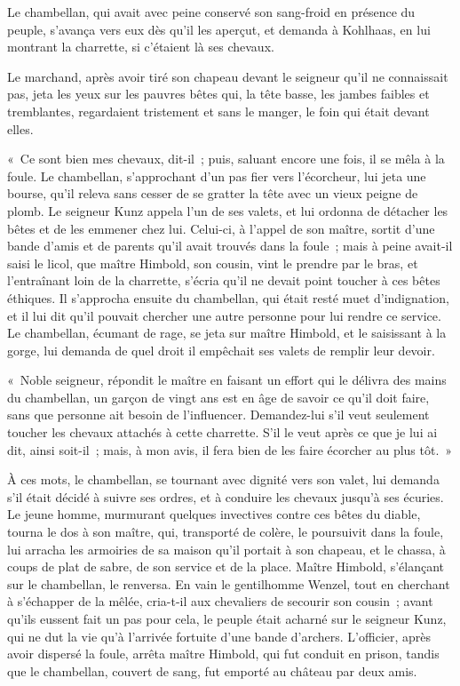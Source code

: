 \documentclass[french,twoside]{book} %
\begin{document}
Le chambellan, qui avait avec peine conservé son sang-froid en présence du peuple, s’avança vers eux dès qu’il les aperçut, et demanda à Kohlhaas, en lui montrant la charrette, si c’étaient là ses chevaux.\par
Le marchand, après avoir tiré son chapeau devant le seigneur qu’il ne connaissait pas, jeta les yeux sur les pauvres bêtes qui, la tête basse, les jambes faibles et tremblantes, regardaient tristement et sans le manger, le foin qui était devant elles.\par
« Ce sont bien mes chevaux, dit-il ; puis, saluant encore une fois, il se mêla à la foule. Le chambellan, s’approchant d’un pas fier vers l’écorcheur, lui jeta une bourse, qu’il releva sans cesser de se gratter la tête avec un vieux peigne de plomb. Le seigneur Kunz appela l’un de ses valets, et lui ordonna de détacher les bêtes et de les emmener chez lui. Celui-ci, à l’appel de son maître, sortit d’une bande d’amis et de parents qu’il avait trouvés dans la foule ; mais à peine avait-il saisi le licol, que maître Himbold, son cousin, vint le prendre par le bras, et l’entraînant loin de la charrette, s’écria qu’il ne devait point toucher à ces bêtes éthiques. Il s’approcha ensuite du chambellan, qui était resté muet d’indignation, et il lui dit qu’il pouvait chercher une autre personne pour lui rendre ce service. Le chambellan, écumant de rage, se jeta sur maître Himbold, et le saisissant à la gorge, lui demanda de quel droit il empêchait ses valets de remplir leur devoir.\par
« Noble seigneur, répondit le maître en faisant un effort qui le délivra des mains du chambellan, un garçon de vingt ans est en âge de savoir ce qu’il doit faire, sans que personne ait besoin de l’influencer. Demandez-lui s’il veut seulement toucher les chevaux attachés à cette charrette. S’il le veut après ce que je lui ai dit, ainsi soit-il ; mais, à mon avis, il fera bien de les faire écorcher au plus tôt. »\par
À ces mots, le chambellan, se tournant avec dignité vers son valet, lui demanda s’il était décidé à suivre ses ordres, et à conduire les chevaux jusqu’à ses écuries. Le jeune homme, murmurant quelques invectives contre ces bêtes du diable, tourna le dos à son maître, qui, transporté de colère, le poursuivit dans la foule, lui arracha les armoiries de sa maison qu’il portait à son chapeau, et le chassa, à coups de plat de sabre, de son service et de la place. Maître Himbold, s’élançant sur le chambellan, le renversa. En vain le gentilhomme Wenzel, tout en cherchant à s’échapper de la mêlée, cria-t-il aux chevaliers de secourir son cousin ; avant qu’ils eussent fait un pas pour cela, le peuple était acharné sur le seigneur Kunz, qui ne dut la vie qu’à l’arrivée fortuite d’une bande d’archers. L’officier, après avoir dispersé la foule, arrêta maître Himbold, qui fut conduit en prison, tandis que le chambellan, couvert de sang, fut emporté au château par deux amis.\par
\end{document}
